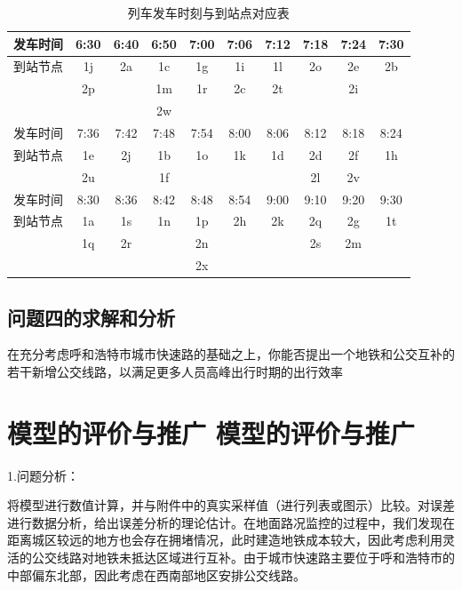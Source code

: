 \documentclass[12pt,a4paper]{mcmthesis}
\begin{document}
    \begin{table}[h]
        \centering
        \caption{列车发车时刻与到站点对应表}
        \label{tab:p4_timetable}
        \begin{tabular}{c|ccccccccc}
            \hline
            发车时间 & 6:30 & 6:40 & 6:50 & 7:00 & 7:06 & 7:12 & 7:18 & 7:24 & 7:30 \\ \hline
            到站节点 & 1j   & 2a   & 1c   & 1g   & 1i   & 1l   & 2o   & 2e   & 2b   \\
            & 2p   &      & 1m   & 1r   & 2c   & 2t   &      & 2i   &      \\
            &      &      & 2w   &      &      &      &      &      &      \\ \hline
            发车时间 & 7:36 & 7:42 & 7:48 & 7:54 & 8:00 & 8:06 & 8:12 & 8:18 & 8:24 \\
            到站节点 & 1e   & 2j   & 1b   & 1o   & 1k   & 1d   & 2d   & 2f   & 1h   \\
            & 2u   &      & 1f   &      &      &      & 2l   & 2v   &      \\ \hline
            发车时间 & 8:30 & 8:36 & 8:42 & 8:48 & 8:54 & 9:00 & 9:10 & 9:20 & 9:30 \\
            到站节点 & 1a   & 1s   & 1n   & 1p   & 2h   & 2k   & 2q   & 2g   & 1t   \\
            & 1q   & 2r   &      & 2n   &      &      & 2s   & 2m   &      \\
            &      &      &      & 2x   &      &      &      &      &      \\ \hline
        \end{tabular}
    \end{table}

    \subsection{问题四的求解和分析}

    在充分考虑呼和浩特市城市快速路的基础之上，你能否提出一个地铁和公交互补的若干新增公交线路，以满足更多人员高峰出行时期的出行效率


    \section{模型的评价与推广 模型的评价与推广}
    1.问题分析：

    将模型进行数值计算，并与附件中的真实采样值（进行列表或图示）比较。对误差进行数据分析，给出误差分析的理论估计。在地面路况监控的过程中，我们发现在距离城区较远的地方也会存在拥堵情况，此时建造地铁成本较大，因此考虑利用灵活的公交线路对地铁未抵达区域进行互补。由于城市快速路主要位于呼和浩特市的中部偏东北部，因此考虑在西南部地区安排公交线路。
\end{document}
